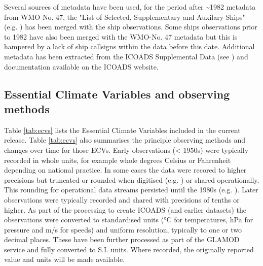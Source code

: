 Several sources of metadata have been used, for the period after \sim 1982 metadata from WMO-No. 47, the "List of Selected, Supplementary and Auxilary Ships" (e.g. \cite{Kent2007}) has been merged with the ship observations.
Some ships observations prior to 1982 have also been merged with the WMO-No. 47 metadata but this is hampered by a lack of ship callsigns within the data before this date.
Additional metadata has been extracted from the ICOADS Supplemental Data (see \cite{Freeman2017}) and documentation available on the ICOADS website.


\subsection{Essential Climate Variables and observing methods}

Table \ref{tab:ecvs} lists the Essential Climate Variables included in the current release. 
Table \ref{tab:ecvs} also summarises the principle observing methods and changes over time for those ECVs.
Early observations (< 1950s) were typically recorded in whole units, for example whole degrees Celsius or Fahrenheit depending on national practice.
In some cases the data were recored to higher precisions but truncated or rounded when digitised (e.g. \cite{Chan2019}) or shared operationally. 
This rounding for operational data streams persisted until the 1980s (e.g. \cite{Willett2008}).
Later observations were typically recorded and shared with precisions of tenths or higher.
As part of the processing to create ICOADS (and earlier datasets) the observations were converted to standardised units (°C for temperatures, hPa for pressure and m/s for speeds) and uniform resolution, typically to one or two decimal places.
These have been further processed as part of the GLAMOD service and fully converted to S.I. units.
Where recorded, the originally reported value and units will be made available.

